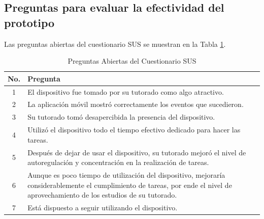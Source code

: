 \documentclass[a4paper,fleqn]{cas-sc}
\begin{document}
	\subsection[\appendixname~\thesection]{Preguntas para evaluar la efectividad del prototipo}
	\label{Appendix:Effectivity}
	Las preguntas abiertas del cuestionario SUS se muestran en la Tabla \ref{tab:EffectivityQuestions}.
	\begin{table}[bt!]
		\centering
		\caption{Preguntas Abiertas del Cuestionario SUS \label{tab:EffectivityQuestions}}	
		\begin{tabularx}{\textwidth}{c X }
			\toprule
			\textbf{No.} & \textbf{Pregunta} \\
			\midrule
			1 & El dispositivo fue tomado por su tutorado como algo atractivo. \\
			2 & La aplicación móvil mostró correctamente los eventos que sucedieron. \\
			3 & Su tutorado tomó desapercibida la presencia del dispositivo. \\
			4 & Utilizó el dispositivo todo el tiempo efectivo dedicado para hacer las tareas. \\
			5 & Después de dejar de usar el dispositivo, su tutorado mejoró el nivel de autoregulación y concentración en la realización de tareas. \\
			6 & Aunque es poco tiempo de utilización del dispositivo, mejoraría considerablemente el cumplimiento de tareas, por ende el nivel de aprovechamiento de los estudios de su tutorado. \\
			7 & Está dispuesto a seguir utilizando el dispositivo. \\
			\bottomrule
		\end{tabularx}
	\end{table}
	
\end{document}
